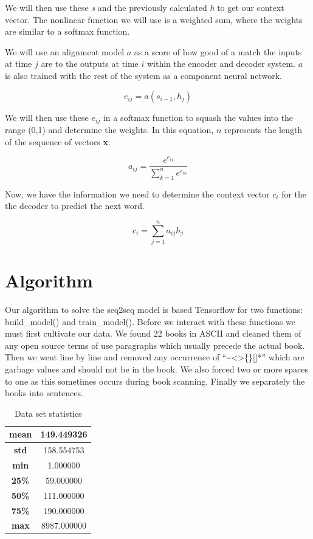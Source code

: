 \documentclass[11pt,a4paper]{scrartcl}
\theoremstyle{definition}
\begin{document}
We will then use these \textit{s} and the previously calculated \textit{h} to get our context vector. The nonlinear function we will use is a weighted sum, where the weights are similar to a softmax function. \newline

We will use an alignment model $a$ as a score of how good of a match the inputs at time $j$ are to the outputs at time $i$ within the encoder and decoder system. $a$ is also trained with the rest of the system as a component neural network.

\[e_{ij} = a(s_{i-1},h_j)\]

We will then use these $e_{ij}$ in a softmax function to squash the values into the range (0,1) and determine the weights. In this equation, $n$ represents the length of the sequence of vectors \textbf{x}.

\[a_{ij} = \frac{e^{e_{ij}}}{\sum_{k=1}^{n}e^{e_{ik}}}\]

Now, we have the information we need to determine the context vector $c_i$ for the the decoder to predict the next word.

\[c_i = \sum_{j=1}^na_{ij}h_j\]

\section{Algorithm}
Our algorithm to solve the seq2seq model is based Tensorflow for two functions: build\_model() and train\_model(). Before we interact with these functions we must first cultivate our data. We found 22 books in ASCII and cleaned them of any open source terms of use paragraphs which usually precede the actual book. Then we went line by line and removed any occurrence of “\textasciitilde<>\{\}[]*” which are garbage values and should not be in the book. We also forced two or more spaces to one as this sometimes occurs during book scanning. Finally we separately the books into sentences.\newline

\FloatBarrier
\begin{table}
\begin{center}
\begin{tabular}{ |c|c|} 
\hline
\textbf{mean} & 149.449326 \\
\hline
\textbf{std} & 158.554753 \\
\hline
\textbf{min} & 1.000000 \\
\hline
\textbf{25\%} & 59.000000 \\
\hline
\textbf{50\%} & 111.000000 \\
\hline
\textbf{75\%} & 190.000000 \\
\hline
\textbf{max} & 8987.000000 \\
\hline
\end{tabular}
\caption{Data set statistics} 
\label{datastats}
\end{center}
\end{table}
\end{document}
